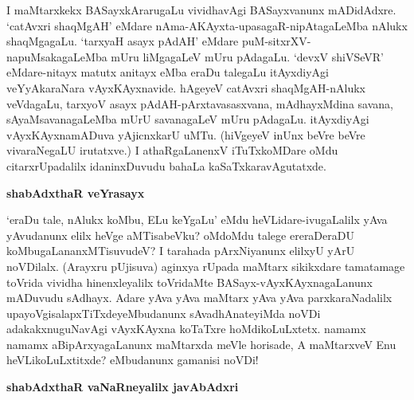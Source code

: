 I maMtarxkekx BASayxkArarugaLu vividhavAgi BASayxvanunx mADidAdxre. 
`catAvxri shaqMgAH' eMdare nAma\--AKAyxta-upasagaR-nipAtagaLeMba nAlukx 
shaqMgagaLu. `tarxyaH asayx pAdAH' eMdare puM-sitxrXV-napuM\-saka\-gaLeMba 
mUru liMgagaLeV mUru pAdagaLu. `devxV shiVSeVR' eMdare-nitayx matutx 
anitayx eMba eraDu talegaLu itAyxdiyAgi veYyAkaraNara vAyxKAyxnavide. hAgeyeV catAvxri shaqMgAH-nAlukx veVda\-gaLu, tarxyoV asayx pAdAH-pArxtavasasxvana, mAdhayxMdina savana, sAyaMsavanagaLeMba mUrU savana\-gaLeV mUru pAdagaLu. itAyxdiyAgi vAyxKAyxnamADuva yAjicnxkarU uMTu. (hiVgeyeV inUnx beVre beVre vivaraNegaLU irutatxve.) I athaRgaLanenxV iTuTxkoMDare oMdu citarxrUpadalilx idaninxDu\-vudu bahaLa kaSaTxkaravAgutatxde.

{\bigskip
\noindent
{\large\bf shabAdxthaR veYrasayx}}\label{page112}
\medskip

\noindent
`eraDu tale, nAlukx koMbu, ELu keYgaLu' eMdu heVLidare-ivugaLalilx yAva 
yAvudanunx elilx heVge aMTisabeVku? oMdoMdu talege ereraDeraDU koMbu\-gaLananxMTisuvudeV? I tarahada pArxNi\-yanunx elilxyU yArU noVDilalx. (Arayxru pUjisuva) aginxya rUpada maMtarx sikikxdare tamatamage toVrida vividha hinenxle\-yalilx toVridaMte BASayx-vAyxKAyxnagaLanunx mADuvudu sAdhayx. Adare yAva yAva maMtarx\- yAva yAva parxkaraNadalilx upayoVgisalapxTiTxdeyeMbudanunx sAva\-dhAnateyiMda noVDi adakakxnu\-guNa\-vAgi vAyxKAyxna koTaTxre hoMdikoLuLxtetx. namamx namamx aBipArxyagaLanunx maMtarxda meVle hori\-sade, A maMtarxveV Enu heVLikoLuLx\-titxde? eMbudanunx gamanisi noVDi!

{\bigskip
\noindent
{\large\bf shabAdxthaR vaNaRneyalilx javAbAdxri}}\label{page112}
\medskip


